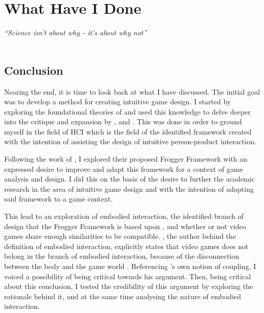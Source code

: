 \chapter{What Have I Done}
\textit{``Science isn't about why - it's about why not''} \\
 \\

\section{Conclusion}
Nearing the end, it is time to look back at what I have discussed. The initial goal was to develop a method for creating intuitive game design. I started by exploring the foundational theories of  and used this knowledge to delve deeper into the critique and expansion by ,  and . This was done in order to ground myself in the field of HCI which is the field of the identified framework created with the intention of assisting the design of intuitive person-product interaction.

Following the work of , I explored their proposed Frogger Framework with an expressed desire to improve and adapt this framework for a context of game analysis and design. I did this on the basis of the desire to further the academic research in the area of intuitive game design and with the intention of adapting said framework to a game context.

This lead to an exploration of embodied interaction, the identified branch of design that the Frogger Framework is based upon \cite{frogger}, and whether or not video games share enough similarities to be compatible. , the author behind the definition of embodied interaction, explicitly states that video games does not belong in the branch of embodied interaction, because of the disconnection between the body and the game world \cite{dourish}. Referencing \citeauthor{dourish}'s \citeyear{dourish} own notion of coupling, I voiced a possibility of being critical towards his argument. Then, being critical about this conclusion, I tested the credibility of this argument by exploring the rationale behind it, and at the same time analysing the nature of embodied interaction.

